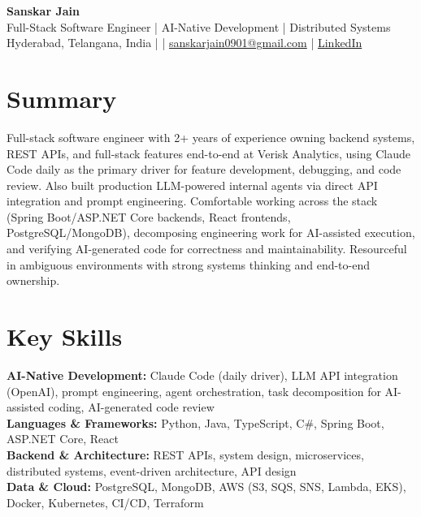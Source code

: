 \documentclass[10pt,letterpaper]{article}
\begin{document}
\begin{center}
    {\Large \textbf{Sanskar Jain}} \\
    Full-Stack Software Engineer | AI-Native Development | Distributed Systems \\
    Hyderabad, Telangana, India \enspace |  \enspace | \enspace
    \href{mailto:sanskarjain0901@gmail.com}{sanskarjain0901@gmail.com} \enspace | \enspace
    \href{https://www.linkedin.com/in/sanskar-jain0901/}{LinkedIn}
\end{center}

\section*{Summary}
Full-stack software engineer with 2+ years of experience owning backend systems, REST APIs, and full-stack features end-to-end at Verisk Analytics, using Claude Code daily as the primary driver for feature development, debugging, and code review. Also built production LLM-powered internal agents via direct API integration and prompt engineering. Comfortable working across the stack (Spring Boot/ASP.NET Core backends, React frontends, PostgreSQL/MongoDB), decomposing engineering work for AI-assisted execution, and verifying AI-generated code for correctness and maintainability. Resourceful in ambiguous environments with strong systems thinking and end-to-end ownership.

\section*{Key Skills}
\textbf{AI-Native Development:} Claude Code (daily driver), LLM API integration (OpenAI), prompt engineering, agent orchestration, task decomposition for AI-assisted coding, AI-generated code review \\
\textbf{Languages \& Frameworks:} Python, Java, TypeScript, C\#, Spring Boot, ASP.NET Core, React \\
\textbf{Backend \& Architecture:} REST APIs, system design, microservices, distributed systems, event-driven architecture, API design \\
\textbf{Data \& Cloud:} PostgreSQL, MongoDB, AWS (S3, SQS, SNS, Lambda, EKS), Docker, Kubernetes, CI/CD, Terraform
\end{document}
